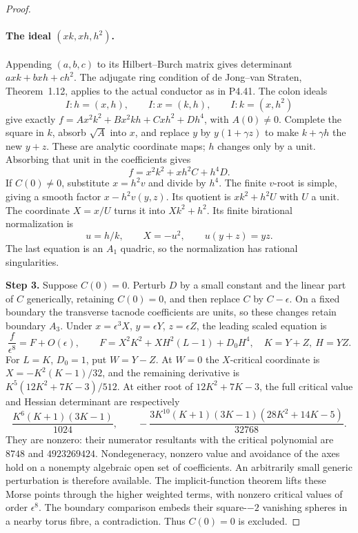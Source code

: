 \begin{proof}
\paragraph{The ideal $(xk,xh,h^2)$.}
Appending $(a,b,c)$ to its Hilbert--Burch matrix gives
determinant $axk+bxh+ch^2$. The adjugate ring condition
of de Jong--van Straten, Theorem~1.12, applies to the
actual conductor as in P4.41. The colon ideals
\[
 I:h=(x,h),\qquad I:x=(k,h),\qquad I:k=(x,h^2)
\]
give exactly
$f=A x^2k^2+B x^2kh+Cxh^2+Dh^4$, with $A(0)\ne0$.
Complete the square in $k$, absorb $\sqrt A$ into $x$,
and replace $y$ by $y(1+\gamma z)$ to make
$k+\gamma h$ the new $y+z$. These are analytic
coordinate maps; $h$ changes only by a unit.
Absorbing that unit in the coefficients gives
\[
                       f=x^2k^2+xh^2C+h^4D.          \tag{4.49a}
\]
If $C(0)\ne0$, substitute $x=h^2v$ and divide by
$h^4$. The finite $v$-root is simple, giving a smooth
factor $x-h^2v(y,z)$. Its quotient is $xk^2+h^2U$
with $U$ a unit. The coordinate $X=x/U$ turns it
into $Xk^2+h^2$. Its finite birational normalization is
\[
                 u=h/k,\qquad X=-u^2,
                 \qquad u(y+z)=yz.
\]
The last equation is an $A_1$ quadric, so the
normalization has rational singularities.

\noindent\textbf{Step 3.} Suppose $C(0)=0$. Perturb $D$ by a small constant
and the linear part of $C$ generically, retaining
$C(0)=0$, and then replace $C$ by $C-\epsilon$.
On a fixed boundary the transverse tacnode coefficients
are units, so these changes retain boundary $A_3$.
Under $x=\epsilon^3X$, $y=\epsilon Y$,
$z=\epsilon Z$, the leading scaled equation is
\[
 \frac f{\epsilon^8}=F+O(\epsilon),\qquad
 F=X^2K^2+XH^2(L-1)+D_0H^4,
 \quad K=Y+Z,\ H=YZ.
\]
For $L=K$, $D_0=1$, put $W=Y-Z$.
At $W=0$ the $X$-critical coordinate is
$X=-K^2(K-1)/32$, and the remaining derivative is
$K^5(12K^2+7K-3)/512$.
At either root of $12K^2+7K-3$, the full critical
value and Hessian determinant are respectively
\[
 \frac{K^6(K+1)(3K-1)}{1024},\qquad
 -\frac{3K^{10}(K+1)(3K-1)(28K^2+14K-5)}{32768}.
\]
They are nonzero: their numerator resultants with the
critical polynomial are $8748$ and $4923269424$.
Nondegeneracy, nonzero value and avoidance of the axes
hold on a nonempty algebraic open set of coefficients.
An arbitrarily small generic perturbation is therefore
available. The implicit-function theorem lifts these
Morse points through the higher weighted terms, with
nonzero critical values of order $\epsilon^8$.
The boundary comparison embeds their square-$-2$
vanishing spheres in a nearby torus fibre, a
contradiction. Thus $C(0)=0$ is excluded.


\end{proof}
